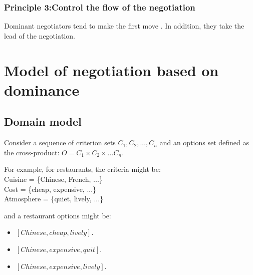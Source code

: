 \documentclass{llncs}
\begin{document}
					\subsubsection{Principle 3:Control the flow of the negotiation}

						Dominant negotiators tend to make the first move \cite{magee2007power}. In addition, they take the lead of the negotiation.
						
						

	\section{Model of negotiation based on dominance}
				\subsection{Domain model}
				Consider a sequence of criterion sets $C_1, C_2, ..., C_n$ and an options set defined as the cross-product:
				$O = C_1 \times C_2 \times \ldots C_n$.
				
				For example, for restaurants, the criteria might be: \\
				Cuisine = \{Chinese, French, ...\} \\
				Cost = \{cheap, expensive, ...\} \\
				Atmosphere = \{quiet, lively, ...\} \\
				
				\par and a restaurant options might be: 
				\begin{itemize}
					\item $[Chinese, cheap, lively]$. 
					\item $[Chinese, expensive, quit]$.   
					\item $[Chinese, expensive, lively]$.
				\end{itemize}
				
\end{document}
